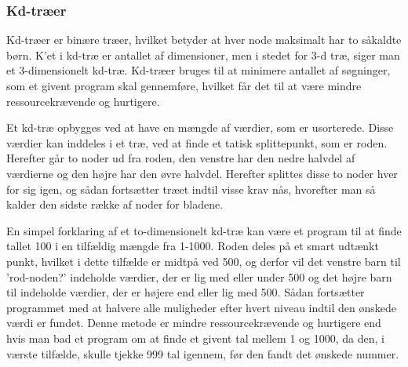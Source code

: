 \subsubsection{Kd-træer}
\label{sec:kdtree}

Kd-træer er binære træer, hvilket betyder at hver node maksimalt har to såkaldte børn. K'et i kd-træ er antallet af dimensioner, men i stedet for 3-d træ, siger man et 3-dimensionelt kd-træ. Kd-træer bruges til at minimere antallet af søgninger, som et givent program skal gennemføre, hvilket får det til at være mindre ressourcekrævende og hurtigere. 

Et kd-træ opbygges ved at have en mængde af værdier, som er usorterede. Disse værdier kan inddeles i et træ, ved at finde et tatisk splittepunkt, som er roden. Herefter går to noder ud fra roden, den venstre har den nedre halvdel af værdierne og den højre har den øvre halvdel. Herefter splittes disse to noder hver for sig igen, og sådan fortsætter træet indtil visse krav nås, hvorefter man så kalder den sidste række af noder for bladene. 

En simpel forklaring af et to-dimensionelt kd-træ kan være et program til at finde tallet 100 i en tilfældig mængde fra 1-1000. Roden deles på et smart udtænkt punkt, hvilket i dette tilfælde er midtpå ved 500, og derfor vil det venstre barn til 'rod-noden?' indeholde værdier, der er lig med eller under 500 og det højre barn til indeholde værdier, der er højere end eller lig med 500. Sådan fortsætter programmet med at halvere alle muligheder efter hvert niveau indtil den ønskede værdi er fundet. Denne metode er mindre ressourcekrævende og hurtigere end hvis man bad et program om at finde et givent tal mellem 1 og 1000, da den, i værste tilfælde, skulle tjekke 999 tal igennem, før den fandt det ønskede nummer.